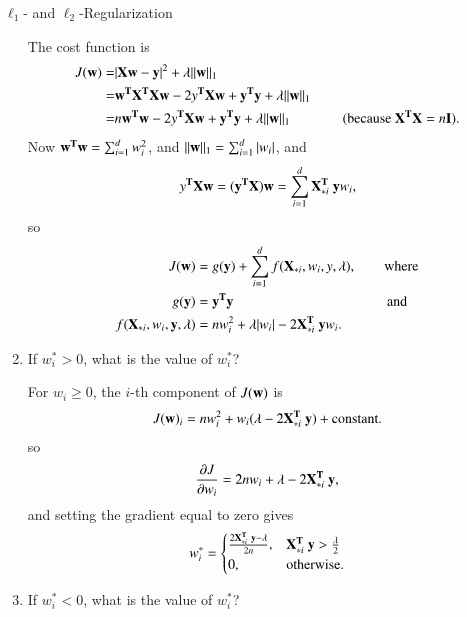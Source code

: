 \documentclass[section]{problemset}
\begin{document}
\begin{problem}{$\ell_1$- and $\ell_2$-Regularization}
\begin{enumerate}
\begin{mdframed}
  The cost function is
  \begin{align*}
    J(\mathbf w)
    =& |\mathbf X\mathbf w - \mathbf y|^2 + \lambda ||\mathbf w||_1 \\
    =& \mathbf w^{\mathbf{T}}\mathbf X^{\mathbf{T}}\mathbf X\mathbf w - 2y^{\mathbf{T}}\mathbf X\mathbf w + \mathbf y^{\mathbf{T}}\mathbf y + \lambda ||\mathbf w||_1 \\
    =& n\mathbf w^{\mathbf{T}}\mathbf w - 2y^{\mathbf{T}}\mathbf X\mathbf w + \mathbf y^{\mathbf{T}}\mathbf y + \lambda ||\mathbf w||_1 ~~~~~~~~~~~~~~~\text{(because $\mathbf X^{\mathbf{T}}\mathbf X=n\mathbf I$)}.\\
  \end{align*}
Now $\mathbf w^{\mathbf{T}}\mathbf w = \sum_{i=1}^d w_i^2$, and $||\mathbf w||_1 = \sum_{i=1}^d |w_i|$, and
\begin{align*}
  y^{\mathbf{T}}\mathbf X\mathbf w &= (\mathbf y^{\mathbf{T}}\mathbf X) \mathbf w = \sum_{i=1}^d \mathbf X_{*i}^{\mathbf{T}} ~\mathbf y w_i, \\
\end{align*}
so
\begin{align*}
  J(\mathbf w) &= g(\mathbf y) + \sum_{i=1}^d f(\mathbf X_{*i}, w_i, y, \lambda), ~~~~~~~~\text{where}\\
  g(\mathbf y) &= \mathbf y^{\mathbf{T}}\mathbf y ~~~~~~~~~~~~~~~~~~~~~~~~~~~~~~~~~~~~~~~~~~~~\text{and}\\
  f(\mathbf X_{*i}, w_i, \mathbf y, \lambda) &= nw_i^2 + \lambda|w_i| - 2\mathbf X_{*i}^{\mathbf{T}} ~\mathbf y w_i.
\end{align*}
\end{mdframed}

\item
If $w_i^* > 0$, what is the value of $w_i^*$?

\begin{mdframed}
For $w_i \geq 0$, the $i$-th component of $J(\mathbf w)$ is
\begin{align*}
  J(\mathbf w)_i = nw_i^2 + w_i (\lambda  - 2\mathbf X_{*i}^{\mathbf{T}} ~\mathbf y) + \text{constant}.
\end{align*}
so
\begin{align*}
  \frac{\partial J}{\partial w_i} = 2nw_i + \lambda - 2\mathbf X_{*i}^{\mathbf{T}} ~\mathbf y,
\end{align*}
and setting the gradient equal to zero gives
\begin{align*}
  w^*_i =
  \begin{cases}
    \frac{ 2\mathbf X_{*i}^{\mathbf{T}} ~\mathbf y - \lambda }{2n}, &\mathbf X_{*i}^{\mathbf{T}} ~\mathbf y  > \frac{\lambda}{2}\\
    0,                                     &\text{otherwise}.
  \end{cases}
\end{align*}
\end{mdframed}

\item
If $w_i^* < 0$, what is the value of $w_i^*$?


\end{enumerate}
\end{problem}
\end{document}

